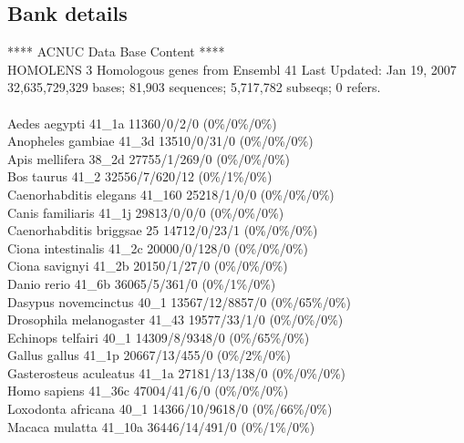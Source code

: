 \documentclass{article}
\begin{document}
\begin{Schunk}
\subsection{Bank details}
            ****     ACNUC Data Base Content      ****  \\
       HOMOLENS 3 Homologous genes from Ensembl 41 Last Updated: Jan 19, 2007\\
32,635,729,329 bases; 81,903 sequences; 5,717,782 subseqs; 0 refers.\\
\\
Aedes aegypti                           41\_1a 11360/0/2/0 (0\%/0\%/0\%)\\
Anopheles gambiae                       41\_3d 13510/0/31/0 (0\%/0\%/0\%)\\
Apis mellifera                          38\_2d 27755/1/269/0 (0\%/0\%/0\%)\\
Bos taurus                              41\_2 32556/7/620/12 (0\%/1\%/0\%)\\
Caenorhabditis elegans                  41\_160 25218/1/0/0 (0\%/0\%/0\%)\\
Canis familiaris                        41\_1j 29813/0/0/0 (0\%/0\%/0\%)\\
Caenorhabditis briggsae                 25 14712/0/23/1 (0\%/0\%/0\%)\\
Ciona intestinalis                      41\_2c 20000/0/128/0 (0\%/0\%/0\%)\\
Ciona savignyi                          41\_2b 20150/1/27/0 (0\%/0\%/0\%)\\
Danio rerio                             41\_6b 36065/5/361/0 (0\%/1\%/0\%)\\
Dasypus novemcinctus                    40\_1 13567/12/8857/0 (0\%/65\%/0\%)\\
Drosophila melanogaster                 41\_43 19577/33/1/0 (0\%/0\%/0\%)\\
Echinops telfairi                       40\_1 14309/8/9348/0 (0\%/65\%/0\%)\\
Gallus gallus                           41\_1p 20667/13/455/0 (0\%/2\%/0\%)\\
Gasterosteus aculeatus                  41\_1a 27181/13/138/0 (0\%/0\%/0\%)\\
Homo sapiens                            41\_36c 47004/41/6/0 (0\%/0\%/0\%)\\
Loxodonta africana                      40\_1 14366/10/9618/0 (0\%/66\%/0\%)\\
Macaca mulatta                          41\_10a 36446/14/491/0 (0\%/1\%/0\%)\\

\end{Schunk}
\end{document}
